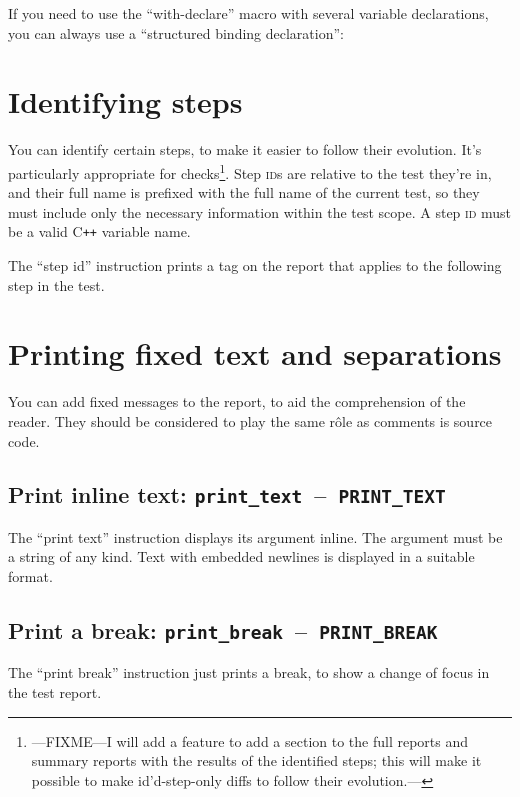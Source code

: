 \documentclass[twoside, a4paper, article]{memoir}
\newcommand*\testudocolor{\color{red!80!blue}}
\newcommand*\testudo[1]{\texttt{\testudocolor{}#1}}
\newcommand*\testudopair[2]{\testudo{#1}~--~\testudo{#2}}
\newcommand\subsectiontestudopair[3]{%
  \subsection[#1]{#1: \testudopair{#2}{#3}}}
\providecommand\typesetexample[1]{%
}
\newcommand*\Cpp{C\texttt{++}}
\begin{document}
If you need to use the ``with-declare'' macro with several variable
declarations, you can always use a ``structured binding declaration'':

\typesetexample{with-declare-several}

\section{Identifying steps}
\label{sec:identifying-steps}

You can identify certain steps, to make it easier to follow their evolution.
It's particularly appropriate for checks\footnote{---FIXME---I will add a
  feature to add a section to the full reports and summary reports with the
  results of the identified steps; this will make it possible to make
  id'd-step-only diffs to follow their evolution.---}.  Step \textsc{id}s are
relative to the test they're in, and their full name is prefixed with the full
name of the current test, so they must include only the necessary information
within the test scope.  A step \textsc{id} must be a valid \Cpp{} variable
name.

The ``step id'' instruction prints a tag on the report that applies to the
following step in the test.

\typesetexample{step-id}


\section{Printing fixed text and separations}
\label{sec:printing-text-separations}

You can add fixed messages to the report, to aid the comprehension of the
reader.  They should be considered to play the same rôle as comments is source
code.

\subsectiontestudopair{Print inline text}{print\_text}{PRINT\_TEXT}
\label{sec:print-inline-text}

The ``print text'' instruction displays its argument inline.  The argument must
be a string of any kind.  Text with embedded newlines is displayed in a
suitable format.

\typesetexample{print-text}


\subsectiontestudopair{Print a break}{print\_break}{PRINT\_BREAK}
\label{sec:print-break}

The ``print break'' instruction just prints a break, to show a change of focus
in the test report.

\typesetexample{print-break}
\end{document}
